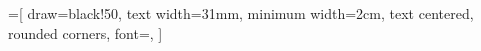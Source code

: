 

=[
  draw=black!50,
  text width=31mm,
  minimum width=2cm,
  text centered,
  rounded corners,
  font=\scriptsize,
]

\newcommand\blocktext[2]{{#1}\\{\color{black!70}#2}}

\begin{tikzpicture}
  [node distance=5mm and 7mm, outer sep=0mm, inner xsep=-1mm]


\end{tikzpicture}
